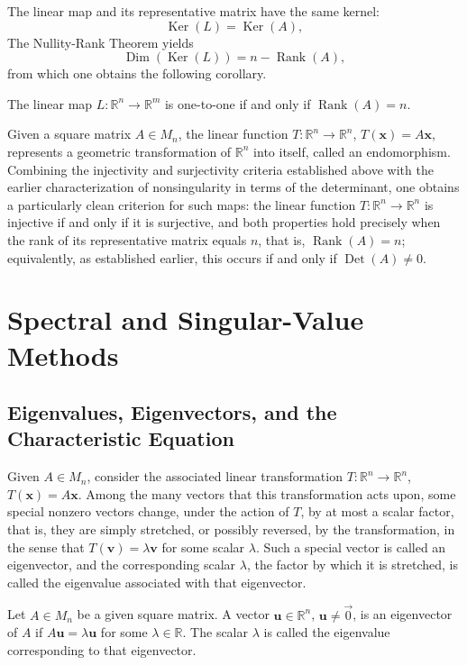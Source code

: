 The linear map and its representative matrix have the same kernel:
\[
\operatorname{Ker}(L) = \operatorname{Ker}(A),
\]
The Nullity-Rank Theorem yields
\[
\operatorname{Dim}(\operatorname{Ker}(L)) = n - \operatorname{Rank}(A),
\]
from which one obtains the following corollary.

\begin{corollary}
The linear map $L : \mathbb{R}^n \to \mathbb{R}^m$ is one-to-one if and only if $\operatorname{Rank}(A) = n$.
\end{corollary}


Given a square matrix $A \in M_n$, the linear function $T : \mathbb{R}^n \to \mathbb{R}^n$, $T(\mathbf{x}) = A\mathbf{x}$, represents a geometric transformation of $\mathbb{R}^n$ into itself, called an endomorphism. Combining the injectivity and surjectivity criteria established above with the earlier characterization of nonsingularity in terms of the determinant, one obtains a particularly clean criterion for such maps: the linear function $T : \mathbb{R}^n \to \mathbb{R}^n$ is injective if and only if it is surjective, and both properties hold precisely when the rank of its representative matrix equals $n$, that is, $\operatorname{Rank}(A) = n$; equivalently, as established earlier, this occurs if and only if $\operatorname{Det}(A) \neq 0$.

\section{Spectral and Singular-Value Methods}

\subsection{Eigenvalues, Eigenvectors, and the Characteristic Equation}

Given $A \in M_n$, consider the associated linear transformation $T : \mathbb{R}^n \to \mathbb{R}^n$, $T(\mathbf{x}) = A\mathbf{x}$. Among the many vectors that this transformation acts upon, some special nonzero vectors change, under the action of $T$, by at most a scalar factor, that is, they are simply stretched, or possibly reversed, by the transformation, in the sense that $T(\mathbf{v}) = \lambda \mathbf{v}$ for some scalar $\lambda$. Such a special vector is called an eigenvector, and the corresponding scalar $\lambda$, the factor by which it is stretched, is called the eigenvalue associated with that eigenvector.

\begin{definition}
Let $A \in M_n$ be a given square matrix. A vector $\mathbf{u} \in \mathbb{R}^n$, $\mathbf{u} \neq \vec{0}$, is an eigenvector of $A$ if $A\mathbf{u} = \lambda \mathbf{u}$ for some $\lambda \in \mathbb{R}$. The scalar $\lambda$ is called the eigenvalue corresponding to that eigenvector.
\end{definition}

